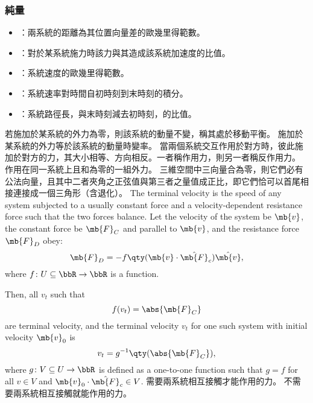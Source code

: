 \documentclass[a4paper,12pt]{article}
\begin{document}
\subsubsection{純量}
\begin{itemize}
\item{}：兩系統的距離為其位置向量差的歐幾里得範數。
\item{}：對於某系統施力時該力與其造成該系統加速度的比值。
\item{}：系統速度的歐幾里得範數。
\item{}：系統速率對時間自初時刻到末時刻的積分。
\item{}：系統路徑長，與末時刻減去初時刻，的比值。
\end{itemize}
若施加於某系統的外力為零，則該系統的動量不變，稱其處於移動平衡。
施加於某系統的外力等於該系統的動量時變率。
當兩個系統交互作用於對方時，彼此施加於對方的力，其大小相等、方向相反。一者稱作用力，則另一者稱反作用力。
作用在同一系統上且和為零的一組外力。
三維空間中三向量合為零，則它們必有公法向量，且其中二者夾角之正弦值與第三者之量值成正比，即它們恰可以首尾相接連接成一個三角形（含退化）。
The terminal velocity is the speed of any system subjected to a usually constant force and a velocity-dependent resistance force such that the two forces balance. Let the velocity of the system be $\mb{v}$, the constant force be $\mb{F}_C$ and parallel to $\mb{v}$, and the resistance force $\mb{F}_D$ obey:
\[\mb{F}_D=-f\qty(\mb{v}\cdot\hat{\mb{F}}_c)\hat{\mb{v}},\]
where $f\colon U\subseteq\bbR\to\bbR$ is a function.

Then, all $v_t$ such that
\[f(v_t)=\abs{\mb{F}_C}\]
are terminal velocity, and the terminal velocity $v_t$ for one such system with initial velocity $\mb{v}_0$ is
\[v_t=g^{-1}\qty(\abs{\mb{F}_C}),\]
where $g\colon V\subseteq U\to\bbR$ is defined as a one-to-one function such that $g=f$ for all $v\in V$ and $\mb{v}_0\cdot\hat{\mb{F}}_c\in V$.
需要兩系統相互接觸才能作用的力。
不需要兩系統相互接觸就能作用的力。
\end{document}
